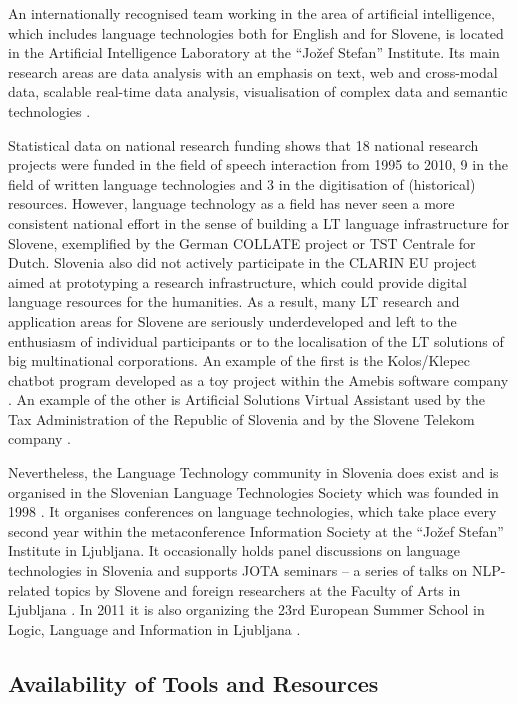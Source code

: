 \begin{multicols}{2}
An internationally recognised team working in the area of artificial intelligence, which includes language technologies both for English and for Slovene, is located in the Artificial Intelligence Laboratory at the “Jožef Stefan” Institute. Its main research areas are data analysis with an emphasis on text, web and cross-modal data, scalable real-time data analysis, visualisation of complex data and semantic technologies \cite{Ailab1}.

Statistical data on national research funding shows that 18 national research projects were funded in the field of speech interaction from 1995 to 2010, 9 in the field of written language technologies and 3 in the digitisation of (historical) resources. However, language technology as a field has never seen a more consistent national effort in the sense of building a LT language infrastructure for Slovene, exemplified by the German COLLATE project or TST Centrale for Dutch. Slovenia also did not actively participate in the CLARIN EU project aimed at prototyping a research infrastructure, which could provide digital language resources for the humanities. As a result, many LT research and application areas for Slovene are seriously underdeveloped and left to the enthusiasm of individual participants or to the localisation of the LT solutions of big multinational corporations. An example of the first is the Kolos/Klepec chatbot program developed as a toy project within the Amebis software company \cite{Amb7}.  An example of the other is Artificial Solutions Virtual Assistant used by the Tax Administration of the Republic of Slovenia and by the Slovene Telekom company \cite{Chat1}. 

Nevertheless, the Language Technology community in Slovenia does exist and is organised in the Slovenian Language Technologies Society which was founded in 1998 \cite{SDJT1}. It organises conferences on language technologies, which take place every second year within the metaconference Information Society at the “Jožef Stefan” Institute in Ljub\-ljana.  It occasionally holds panel discussions on language technologies in Slovenia and supports JOTA seminars – a series of talks on NLP-related topics by Slovene and foreign researchers at the Faculty of Arts in Ljub\-ljana \cite{Jota1}. In 2011 it is also organizing the 23rd European Summer School in Logic, Language and Information in Ljub\-ljana \cite{ESSLLI1}.  
  
\subsection{Availability of Tools and Resources}


\end{multicols}
